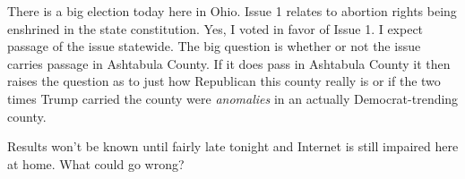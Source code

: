 There is a big election today here in Ohio. Issue 1 relates to abortion
rights being enshrined in the state constitution. Yes, I voted in favor
of Issue 1. I expect passage of the issue statewide. The big question is
whether or not the issue carries passage in Ashtabula County. If it does
pass in Ashtabula County it then raises the question as to just how
Republican this county really is or if the two times Trump carried the
county were \emph{anomalies} in an actually Democrat-trending county.

Results won't be known until fairly late tonight and Internet is still
impaired here at home. What could go wrong?
